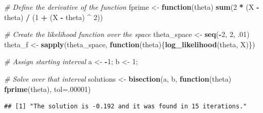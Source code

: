 \documentclass[]{article}
\newenvironment{Shaded}{\begin{snugshade}}{\end{snugshade}}
\newcommand{\KeywordTok}[1]{\textcolor[rgb]{0.13,0.29,0.53}{\textbf{#1}}}
\newcommand{\DataTypeTok}[1]{\textcolor[rgb]{0.13,0.29,0.53}{#1}}
\newcommand{\DecValTok}[1]{\textcolor[rgb]{0.00,0.00,0.81}{#1}}
\newcommand{\CharTok}[1]{\textcolor[rgb]{0.31,0.60,0.02}{#1}}
\newcommand{\StringTok}[1]{\textcolor[rgb]{0.31,0.60,0.02}{#1}}
\newcommand{\CommentTok}[1]{\textcolor[rgb]{0.56,0.35,0.01}{\textit{#1}}}
\newcommand{\ControlFlowTok}[1]{\textcolor[rgb]{0.13,0.29,0.53}{\textbf{#1}}}
\newcommand{\OperatorTok}[1]{\textcolor[rgb]{0.81,0.36,0.00}{\textbf{#1}}}
\newcommand{\NormalTok}[1]{#1}
\begin{document}
\begin{Shaded}
\begin{Highlighting}[]
\CommentTok{# Define the derivative of the function}
\NormalTok{fprime <-}\StringTok{ }\ControlFlowTok{function}\NormalTok{(theta) }\KeywordTok{sum}\NormalTok{(}\DecValTok{2} \OperatorTok{*}\StringTok{ }\NormalTok{(X }\OperatorTok{-}\StringTok{ }\NormalTok{theta) }\OperatorTok{/}\StringTok{ }\NormalTok{(}\DecValTok{1} \OperatorTok{+}\StringTok{ }\NormalTok{(X }\OperatorTok{-}\StringTok{ }\NormalTok{theta) }\OperatorTok{^}\StringTok{ }\DecValTok{2}\NormalTok{))}

\CommentTok{# Create the likelihood function over the space}
\NormalTok{theta_space <-}\StringTok{ }\KeywordTok{seq}\NormalTok{(}\OperatorTok{-}\DecValTok{2}\NormalTok{, }\DecValTok{2}\NormalTok{, .}\DecValTok{01}\NormalTok{)}
\NormalTok{theta_f <-}\StringTok{ }\KeywordTok{sapply}\NormalTok{(theta_space, }\ControlFlowTok{function}\NormalTok{(theta)\{}\KeywordTok{log_likelihood}\NormalTok{(theta, X)\})}

\CommentTok{# Assign starting interval}
\NormalTok{a <-}\StringTok{ }\OperatorTok{-}\DecValTok{1}\NormalTok{; b <-}\StringTok{ }\DecValTok{1}\NormalTok{;}

\CommentTok{# Solve over that interval}
\NormalTok{solutions <-}\StringTok{ }\KeywordTok{bisection}\NormalTok{(a, b, }\ControlFlowTok{function}\NormalTok{(theta) }\KeywordTok{fprime}\NormalTok{(theta), }\DataTypeTok{tol=}\NormalTok{.}\DecValTok{00001}\NormalTok{)}
\end{Highlighting}
\end{Shaded}

\begin{verbatim}
## [1] "The solution is -0.192 and it was found in 15 iterations."
\end{verbatim}

\begin{Shaded}
\end{Shaded}
\end{document}
